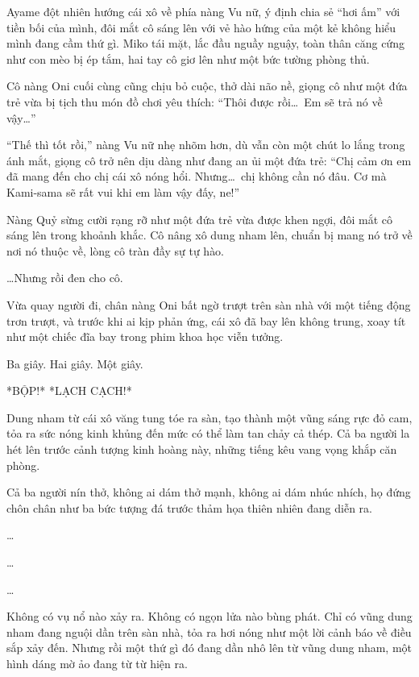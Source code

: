 \documentclass[../main.tex]{subfiles}
\begin{document}

Ayame đột nhiên hướng cái xô về phía nàng Vu nữ, ý định chia sẻ ``hơi ấm'' với tiền bối của mình, đôi mắt cô sáng lên với vẻ hào hứng của một kẻ không hiểu mình đang cầm thứ gì. Miko tái mặt, lắc đầu nguầy nguậy, toàn thân căng cứng như con mèo bị ép tắm, hai tay cô giơ lên như một bức tường phòng thủ.

Cô nàng Oni cuối cùng cũng chịu bỏ cuộc, thở dài não nề, giọng cô như một đứa trẻ vừa bị tịch thu món đồ chơi yêu thích: ``Thôi được rồi\dots\ Em sẽ trả nó về vậy\dots''

``Thế thì tốt rồi,'' nàng Vu nữ nhẹ nhõm hơn, dù vẫn còn một chút lo lắng trong ánh mắt, giọng cô trở nên dịu dàng như đang an ủi một đứa trẻ: ``Chị cảm ơn em đã mang đến cho chị cái xô nóng hổi. Nhưng\dots\ chị không cần nó đâu. Cơ mà Kami-sama sẽ rất vui khi em làm vậy đấy, ne!''

Nàng Quỷ sừng cười rạng rỡ như một đứa trẻ vừa được khen ngợi, đôi mắt cô sáng lên trong khoảnh khắc. Cô nâng xô dung nham lên, chuẩn bị mang nó trở về nơi nó thuộc về, lòng cô tràn đầy sự tự hào.

\dots Nhưng rồi đen cho cô.

Vừa quay người đi, chân nàng Oni bất ngờ trượt trên sàn nhà với một tiếng động trơn trượt, và trước khi ai kịp phản ứng, cái xô đã bay lên không trung, xoay tít như một chiếc đĩa bay trong phim khoa học viễn tưởng.

Ba giây. Hai giây. Một giây.

*BỘP!* *LẠCH CẠCH!*

Dung nham từ cái xô văng tung tóe ra sàn, tạo thành một vũng sáng rực đỏ cam, tỏa ra sức nóng kinh khủng đến mức có thể làm tan chảy cả thép. Cả ba người la hét lên trước cảnh tượng kinh hoàng này, những tiếng kêu vang vọng khắp căn phòng.


Cả ba người nín thở, không ai dám thở mạnh, không ai dám nhúc nhích, họ đứng chôn chân như ba bức tượng đá trước thảm họa thiên nhiên đang diễn ra.

\dots

\dots

\dots

Không có vụ nổ nào xảy ra. Không có ngọn lửa nào bùng phát. Chỉ có vũng dung nham đang nguội dần trên sàn nhà, tỏa ra hơi nóng như một lời cảnh báo về điều sắp xảy đến. Nhưng rồi một thứ gì đó đang dần nhô lên từ vũng dung nham, một hình dáng mờ ảo đang từ từ hiện ra.
\end{document}
